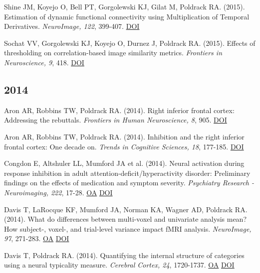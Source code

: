 \documentclass[10pt, letterpaper]{article}
\begin{document}
Shine JM, Koyejo O, Bell PT, Gorgolewski KJ, Gilat M, Poldrack RA.  (2015). Estimation of dynamic functional connectivity using Multiplication of Temporal Derivatives. \textit{NeuroImage, 122}, 399-407. \href{https://doi.org/10.1016/j.neuroimage.2015.07.064}{DOI} \vspace{2mm}

Sochat VV, Gorgolewski KJ, Koyejo O, Durnez J, Poldrack RA.  (2015). Effects of thresholding on correlation-based image similarity metrics. \textit{Frontiers in Neuroscience, 9}, 418. \href{https://doi.org/10.3389/fnins.2015.00418}{DOI} \vspace{2mm}

\subsection*{2014}Aron AR, Robbins TW, Poldrack RA.  (2014). Right inferior frontal cortex: Addressing the rebuttals. \textit{Frontiers in Human Neuroscience, 8}, 905. \href{https://doi.org/10.3389/fnhum.2014.00905}{DOI} \vspace{2mm}

Aron AR, Robbins TW, Poldrack RA.  (2014). Inhibition and the right inferior frontal cortex: One decade on. \textit{Trends in Cognitive Sciences, 18}, 177-185. \href{https://doi.org/10.1016/j.tics.2013.12.003}{DOI} \vspace{2mm}

Congdon E, Altshuler LL, Mumford JA et al. (2014). Neural activation during response inhibition in adult attention-deficit/hyperactivity disorder: Preliminary findings on the effects of medication and symptom severity. \textit{Psychiatry Research - Neuroimaging, 222}, 17-28. \href{https://www.ncbi.nlm.nih.gov/pmc/articles/PMC4009011}{OA} \href{https://doi.org/10.1016/j.pscychresns.2014.02.002}{DOI} \vspace{2mm}

Davis T, LaRocque KF, Mumford JA, Norman KA, Wagner AD, Poldrack RA.  (2014). What do differences between multi-voxel and univariate analysis mean? How subject-, voxel-, and trial-level variance impact fMRI analysis. \textit{NeuroImage, 97}, 271-283. \href{https://www.ncbi.nlm.nih.gov/pmc/articles/PMC4115449}{OA} \href{https://doi.org/10.1016/j.neuroimage.2014.04.037}{DOI} \vspace{2mm}

Davis T, Poldrack RA.  (2014). Quantifying the internal structure of categories using a neural typicality measure. \textit{Cerebral Cortex, 24}, 1720-1737. \href{https://doi.org/10.1093/cercor/bht014}{OA} \href{https://doi.org/10.1093/cercor/bht014}{DOI} \vspace{2mm}
\end{document}
